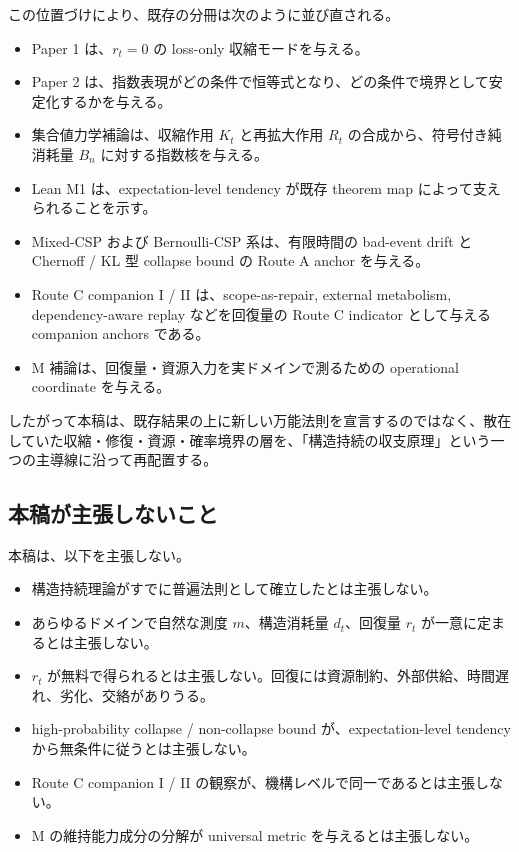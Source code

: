 \documentclass[12pt,a4paper]{article}
\begin{document}
この位置づけにより、既存の分冊は次のように並び直される。

\begin{itemize}
\tightlist
\item
  Paper 1 は、\(r_{t}=0\) の loss-only 収縮モードを与える。
\item
  Paper 2 は、指数表現がどの条件で恒等式となり、どの条件で境界として安定化するかを与える。
\item
  集合値力学補論は、収縮作用 \(K_{t}\) と再拡大作用 \(R_{t}\) の合成から、符号付き純消耗量 \(B_{n}\) に対する指数核を与える。
\item
  Lean M1 は、expectation-level tendency が既存 theorem map によって支えられることを示す。
\item
  Mixed-CSP および Bernoulli-CSP 系は、有限時間の bad-event drift と Chernoff / KL 型 collapse bound の Route A anchor を与える。
\item
  Route C companion I / II は、scope-as-repair, external metabolism, dependency-aware replay などを回復量の Route C indicator として与える companion anchors である。
\item
  M 補論は、回復量・資源入力を実ドメインで測るための operational coordinate を与える。
\end{itemize}

したがって本稿は、既存結果の上に新しい万能法則を宣言するのではなく、散在していた収縮・修復・資源・確率境界の層を、「構造持続の収支原理」という一つの主導線に沿って再配置する。

\subsection{本稿が主張しないこと}\label{ux672cux7a3fux304cux4e3bux5f35ux3057ux306aux3044ux3053ux3068}

本稿は、以下を主張しない。

\begin{itemize}
\tightlist
\item
  構造持続理論がすでに普遍法則として確立したとは主張しない。
\item
  あらゆるドメインで自然な測度 \(m\)、構造消耗量 \(d_{t}\)、回復量 \(r_{t}\) が一意に定まるとは主張しない。
\item
  \(r_{t}\) が無料で得られるとは主張しない。回復には資源制約、外部供給、時間遅れ、劣化、交絡がありうる。
\item
  high-probability collapse / non-collapse bound が、expectation-level tendency から無条件に従うとは主張しない。
\item
  Route C companion I / II の観察が、機構レベルで同一であるとは主張しない。
\item
  M の維持能力成分の分解が universal metric を与えるとは主張しない。
\end{itemize}
\end{document}
